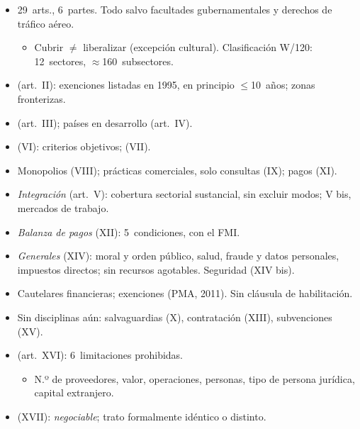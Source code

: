 \documentclass{article}
\begin{document}
\begin{columnas}
\begin{itemize}
\item 29~arts., 6~partes. Todo salvo facultades gubernamentales y derechos de tráfico aéreo.
  \begin{itemize}
  \item Cubrir $\neq$ liberalizar (excepción cultural). Clasificación W/120: 12~sectores, $\approx$160~subsectores.
  \end{itemize}
\end{itemize}
\begin{itemize}
\item {} (art.~II): exenciones listadas en 1995, en principio $\leq$10~años; zonas fronterizas.
\item {} (art.~III); países en desarrollo (art.~IV).
\item {} (VI): criterios objetivos;  (VII).
\item Monopolios (VIII); prácticas comerciales, solo consultas (IX); pagos (XI).
\end{itemize}
\begin{itemize}
\item \emph{Integración} (art.~V): cobertura sectorial sustancial, sin excluir modos; V bis, mercados de trabajo.
\item \emph{Balanza de pagos} (XII): 5~condiciones, con el FMI.
\item \emph{Generales} (XIV): moral y orden público, salud, fraude y datos personales, impuestos directos; sin recursos agotables. Seguridad (XIV bis).
\item Cautelares financieras; exenciones (PMA, 2011). Sin cláusula de habilitación.
\item Sin disciplinas aún: salvaguardias (X), contratación (XIII), subvenciones (XV).
\end{itemize}
\begin{itemize}
\item {} (art.~XVI): 6~limitaciones prohibidas.
  \begin{itemize}
  \item N.º de proveedores, valor, operaciones, personas, tipo de persona jurídica, capital extranjero.
  \end{itemize}
\item {} (XVII): \emph{negociable}; trato formalmente idéntico o distinto.

\end{itemize}
\end{columnas}
\end{document}
